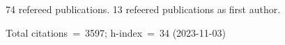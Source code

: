 74 refereed publications. 13 refeered publications as first author.

Total citations~=~3597; h-index~=~34 (2023-11-03)